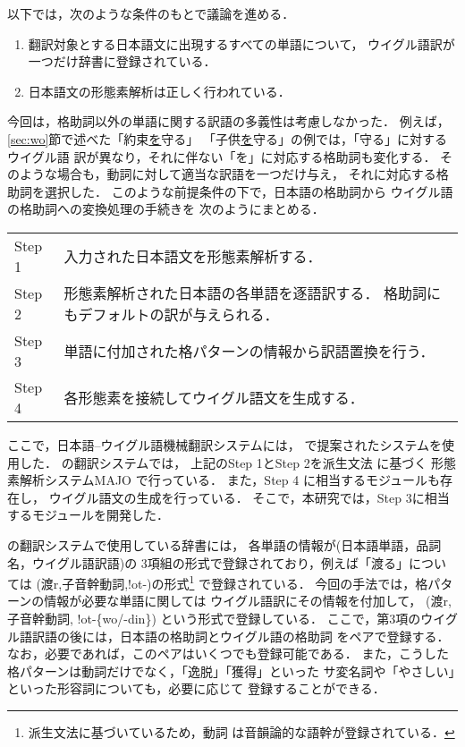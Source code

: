 以下では，次のような条件のもとで議論を進める．
\begin{enumerate}
 \item 翻訳対象とする日本語文に出現するすべての単語について，
	ウイグル語訳が一つだけ辞書に登録されている．
 \item 日本語文の形態素解析は正しく行われている．
\end{enumerate}
今回は，格助詞以外の単語に関する訳語の多義性は考慮しなかった．
例えば，\ref{sec:wo}節で述べた「約束\underline{を}守る」
「子供\underline{を}守る」の例では，「守る」に対するウイグル語
訳が異なり，それに伴ない「を」に対応する格助詞も変化する．
そのような場合も，動詞に対して適当な訳語を一つだけ与え，
それに対応する格助詞を選択した．
このような前提条件の下で，日本語の格助詞から
ウイグル語の格助詞への変換処理の手続きを
次のようにまとめる．

\begin{tabular}[t]{ll}
Step 1 &  入力された日本語文を形態素解析する．\\
Step 2 & 形態素解析された日本語の各単語を逐語訳する．
 格助詞にもデフォルトの訳が与えられる．\\
Step 3 & 単語に付加された格パターンの情報から訳語置換を行う．\\
Step 4 & 各形態素を接続してウイグル語文を生成する．\\
\end{tabular}
\vspace{10pt}

ここで，日本語--ウイグル語機械翻訳システムには，
\cite{OGAWA2000}で提案されたシステムを使用した．
\cite{OGAWA2000}の翻訳システムでは，
上記のStep 1とStep 2を派生文法\cite{KIYOSE1989} に基づく
形態素解析システムMAJO\cite{OGAWA1999} で行っている．
また，Step 4 に相当するモジュールも存在し，
ウイグル語文の生成を行っている．
そこで，本研究では，Step 3に相当するモジュールを開発した．

\cite{OGAWA2000}の翻訳システムで使用している辞書には，
各単語の情報が(日本語単語，品詞名，ウイグル語訳語)の
3項組の形式で登録されており，例えば「渡る」については
(渡r,子音幹動詞,!ot-)の形式\footnote{
派生文法に基づいているため，動詞
は音韻論的な語幹が登録されている．}
で登録されている．
今回の手法では，格パターンの情報が必要な単語に関しては
ウイグル語訳にその情報を付加して，
(渡r,子音幹動詞, !ot-\{wo/-din\})
という形式で登録している．
ここで，第3項のウイグル語訳語の後には，日本語の格助詞とウイグル語の格助詞
をペアで登録する．
なお，必要であれば，このペアはいくつでも登録可能である．
また，こうした格パターンは動詞だけでなく，「逸脱」「獲得」といった
サ変名詞や「やさしい」といった形容詞についても，必要に応じて
登録することができる．

